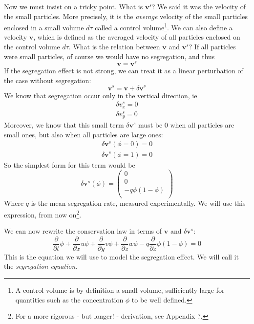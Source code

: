 \documentclass[11pt,a4paper]{report}
\newcommand{\p}[2]{\ensuremath{\frac{\partial {#1}}{\partial {#2}}}}
\newcommand{\vs}{\ensuremath{\mathbf{v}^s}}
\begin{document}
Now we must insist on a tricky point. What is $\vs$? We said it was the velocity of the small particles. More precisely, it is the \textit{average} velocity of the small particles enclosed in a small volume $d\tau$ called a control volume\footnote{A control volume is by definition a small volume, sufficiently large for quantities such as the concentration $\phi$ to be well defined.}. We can also define a velocity $\mathbf{v}$, which is defined as the averaged velocity of all particles enclosed on the control volume $d\tau$.
What is the relation between $\mathbf{v}$ and $\vs$? If all particles were small particles, of course we would have no segregation, and thus
\begin{equation}
	\mathbf{v} = \vs
\end{equation}
If the segregation effect is not strong, we can treat it as a linear perturbation of the case without segregation:
\begin{equation}
	\vs = \mathbf{v} + \delta \textbf{v}^s
\end{equation}
We know that segregation occur only in the vertical direction, ie
\begin{align}
	\delta v^s_x = 0 \\
	\delta v^s_y = 0 
\end{align}
Moreover, we know that this small term $\delta \textbf{v}^s$ must be $0$ when all particles are small ones, but also when all particles are large ones:
\begin{align}
	\delta \textbf{v}^s(\phi = 0) = 0 \\
	\delta \textbf{v}^s(\phi = 1) = 0
\end{align}
So the simplest form for this term would be
\begin{equation}
	\delta \textbf{v}^s(\phi) = 
	\begin{pmatrix}
	0 \\
	0 \\
- q \phi( 1 - \phi ) \\
\end{pmatrix}
\end{equation}
Where $q$ is the mean segregation rate, measured experimentally.
We will use this expression, from now on\footnote{For a more rigorous - but longer! - derivation, see Appendix ?.}.

We can now rewrite the conservation law in terms of $\mathbf{v}$ and $\delta \mathbf{v}^s$:
\begin{equation}
	\p{}{t} \phi + \p{}{x} u \phi + \p{}{y} v \phi + \p{}{z} w \phi - q \p{}{z} \phi( 1 - \phi) = 0
\end{equation}
This is the equation we will use to model the segregation effect. We will call it the \textit{segregation equation}.
 
{}

\end{document}
